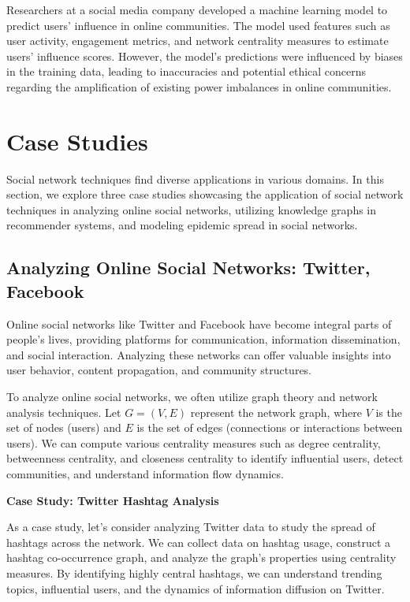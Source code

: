 \documentclass[12pt]{book} %
\begin{document}
Researchers at a social media company developed a machine learning model to predict users' influence in online communities. The model used features such as user activity, engagement metrics, and network centrality measures to estimate users' influence scores. However, the model's predictions were influenced by biases in the training data, leading to inaccuracies and potential ethical concerns regarding the amplification of existing power imbalances in online communities.


\section{Case Studies}

Social network techniques find diverse applications in various domains. In this section, we explore three case studies showcasing the application of social network techniques in analyzing online social networks, utilizing knowledge graphs in recommender systems, and modeling epidemic spread in social networks.

\subsection{Analyzing Online Social Networks: Twitter, Facebook}

Online social networks like Twitter and Facebook have become integral parts of people's lives, providing platforms for communication, information dissemination, and social interaction. Analyzing these networks can offer valuable insights into user behavior, content propagation, and community structures.

To analyze online social networks, we often utilize graph theory and network analysis techniques. Let \(G = (V, E)\) represent the network graph, where \(V\) is the set of nodes (users) and \(E\) is the set of edges (connections or interactions between users). We can compute various centrality measures such as degree centrality, betweenness centrality, and closeness centrality to identify influential users, detect communities, and understand information flow dynamics.

\textbf{Case Study: Twitter Hashtag Analysis}

As a case study, let's consider analyzing Twitter data to study the spread of hashtags across the network. We can collect data on hashtag usage, construct a hashtag co-occurrence graph, and analyze the graph's properties using centrality measures. By identifying highly central hashtags, we can understand trending topics, influential users, and the dynamics of information diffusion on Twitter.
\end{document}
